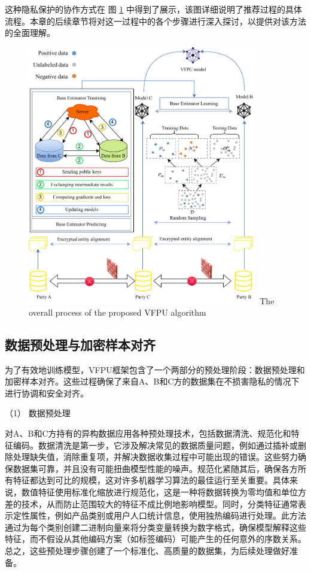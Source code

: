 这种隐私保护的协作方式在 图 \ref{fig:VFPU} 中得到了展示，该图详细说明了推荐过程的具体流程。本章的后续章节将对这一过程中的各个步骤进行深入探讨，以提供对该方法的全面理解。
\vspace{-0.1cm}
\begin{figure}[h]
	\centering
	\includegraphics[width=0.9\textwidth]{chapters/imgs/Figure 1 in JEPG format}
	{\wuhao The overall process of the proposed VFPU algorithm}
	\label{fig:VFPU}
\end{figure}
\vspace{-0.35cm}
\subsection{数据预处理与加密样本对齐}
为了有效地训练模型，VFPU框架包含了一个两部分的预处理阶段：数据预处理和加密样本对齐。这些过程确保了来自A、B和C方的数据集在不损害隐私的情况下进行协调和安全对齐。 

（1） 数据预处理 

对A、B和C方持有的异构数据应用各种预处理技术，包括数据清洗、规范化和特征编码。数据清洗是第一步，它涉及解决常见的数据质量问题，例如通过插补或删除处理缺失值，消除重复项，并解决数据收集过程中可能出现的错误。这些努力确保数据集可靠，并且没有可能扭曲模型性能的噪声。规范化紧随其后，确保各方所有特征都达到可比的规模，这对许多机器学习算法的最佳运行至关重要。具体来说，数值特征使用标准化缩放进行规范化，这是一种将数据转换为零均值和单位方差的技术，从而防止范围较大的特征不成比例地影响模型。同时，分类特征通常表示定性属性，例如产品类别或用户人口统计信息，使用独热编码进行处理。此方法通过为每个类别创建二进制向量来将分类变量转换为数字格式，确保模型解释这些特征，而不假设从其他编码方案（如标签编码）可能产生的任何意外的序数关系。总之，这些预处理步骤创建了一个标准化、高质量的数据集，为后续处理做好准备。

